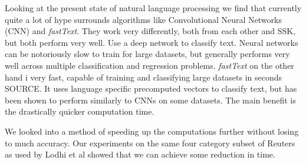 Looking at the present state of natural language processing we find that currently quite a lot of hype surrounds algorithms like Convolutional Neural Networks (CNN) and \textit{fastText}. They work very differently, both from each other and SSK, but both perform very well. Use a deep network to classify text. Neural networks can be notoriously slow to train for large datasets, but generally performs very well across multiple classification and regression problems. \textit{fastText} on the other hand i very fast, capable of training and classifying large datasets in seconds SOURCE. It uses language specific precomputed vectors to classify text, but has been shown to perform similarly to CNNs on some datasets. The main benefit is the drastically quicker computation time.


We looked into a method of speeding up the computations further without losing to much accuracy. Our experiments on the same four category subset of Reuters as used by Lodhi et al showed that we can achieve some reduction in time.

